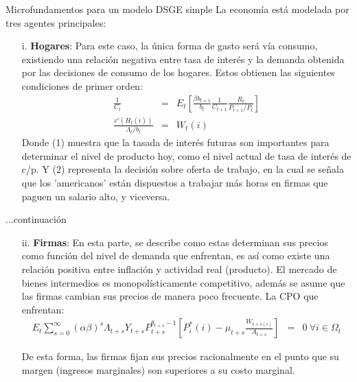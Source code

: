 \documentclass{beamer}
\begin{document}
\begin{frame}{Microfundamentos para un modelo DSGE simple}
La econom\'ia est\'a modelada por tres agentes principales:
\begin{itemize}
\item[i.]{\textbf{Hogares}:}
Para este caso, la \'unica forma de gasto ser\'a v\'ia consumo, existiendo una relaci\'on negativa entre tasa de inter\'es y la demanda obtenida por las decisiones de consumo de los hogares. Estos obtienen las siguientes condiciones de primer orden:
\begin{eqnarray}
\frac{1}{C_{t}} & = & E_{t}\left [ \frac{\beta b_{t+1}}{b_{t}} \frac{1}{C_{t+1}} \frac{R_{t}}{P_{t+1}/P_{t}} \right ] \\
\frac{v'(H_{t}(i))}{\Lambda_{t}/b_{t}} & = & W_{t}(i)
\end{eqnarray}
Donde (1) muestra que la tasada de inter\'es futuras son importantes para determinar el nivel de producto hoy, como el nivel actual de tasa de inter\'es de c/p. Y (2) representa la decisi\'on sobre oferta de trabajo, en la cual se se\~nala que los 'americanos' est\'an dispuestos a trabajar m\'as horas en firmas que paguen un salario alto, y viceversa.
\end{itemize}
\end{frame}


\begin{frame}{...continuaci\'on}
\begin{itemize}
\item[ii.]{\textbf{Firmas}:}
En esta parte, se describe como estas determinan sus precios como funci\'on del nivel de demanda que enfrentan, es as\'i como existe una relaci\'on positiva entre inflaci\'on y actividad real (producto). El mercado de bienes intermedios es monopol\'isticamente competitivo, adem\'as se asume que las firmas cambian sus precios de manera poco frecuente. La CPO que enfrentan:
\begin{eqnarray*}
E_{t}\sum_{s=0}^{\infty}(\alpha\beta)^{s}\Lambda_{t+s}Y_{t+s}P_{t+s}^{\theta_{t+s}-1}\left [ P_{i}^{*}(i)-\mu_{t+s}\frac{W_{t+s(i)}}{A_{t+s}} \right ] & = & 0 \ \forall i\in\Omega_{t}
\end{eqnarray*}

De esta forma, las firmas fijan sus precios racionalmente en el punto que su margen (ingresos marginales) son superiores a su costo marginal.
\end{itemize}
\end{frame}
\end{document}
